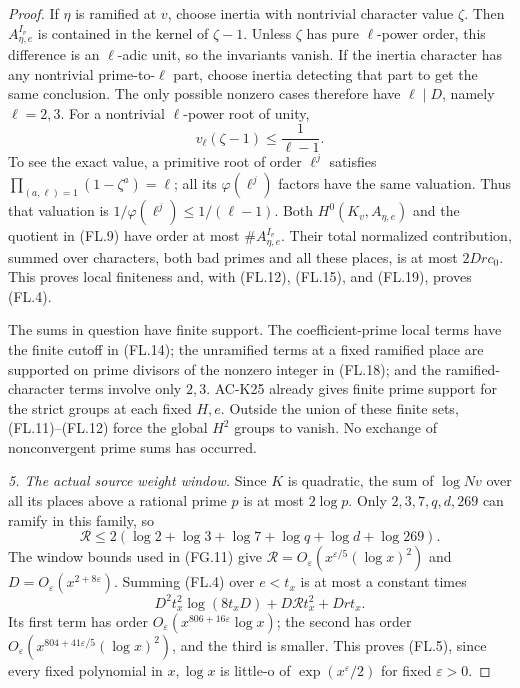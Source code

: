 \begin{proof}
If \(\eta\) is ramified at \(v\), choose inertia with
nontrivial character value \(\zeta\).
Then \(A_{\eta,e}^{I_v}\) is contained in the kernel
of \(\zeta-1\).
Unless \(\zeta\) has pure \(\ell\)-power order, this
difference is an \(\ell\)-adic unit, so the invariants
vanish.  If the inertia character has any nontrivial
prime-to-\(\ell\) part, choose inertia detecting that part
to get the same conclusion.
The only possible nonzero cases therefore have
\(\ell\mid D\), namely \(\ell=2,3\).
For a nontrivial \(\ell\)-power root of unity,
\[
                 v_\ell(\zeta-1)\leq\frac1{\ell-1}.
 \tag{FL.20}
\]
To see the exact value, a primitive root of order
\(\ell^j\) satisfies
\(\prod_{(a,\ell)=1}(1-\zeta^a)=\ell\);
all its \(\varphi(\ell^j)\) factors have the same
valuation.  Thus that valuation is
\(1/\varphi(\ell^j)\leq1/(\ell-1)\).
Both \(H^0(K_v,A_{\eta,e})\) and the quotient in
(FL.9) have order at most \(\#A_{\eta,e}^{I_v}\).
Their total normalized contribution, summed over
characters, both bad primes and all these places, is
at most \(2Dr c_0\).
This proves local finiteness and, with
(FL.12), (FL.15), and (FL.19), proves (FL.4).

The sums in question have finite support.
The coefficient-prime local terms have the finite
cutoff in (FL.14); the unramified terms at a fixed
ramified place are supported on prime divisors of the
nonzero integer in (FL.18); and the ramified-character
terms involve only \(2,3\).
AC-K25 already gives finite prime support for the
strict groups at each fixed \(H,e\).
Outside the union of these finite sets, (FL.11)--(FL.12)
force the global \(H^2\) groups to vanish.
No exchange of nonconvergent prime sums has occurred.

\emph{5. The actual source weight window.}
Since \(K\) is quadratic, the sum of \(\log Nv\)
over all its places above a rational prime \(p\) is
at most \(2\log p\).
Only \(2,3,7,q,d,269\) can ramify in this family, so
\[
 \mathcal R\leq
 2(\log2+\log3+\log7+\log q+\log d+\log269).
 \tag{FL.21}
\]
The window bounds used in (FG.11) give
\(\mathcal R=O_\varepsilon(x^{\varepsilon/5}(\log x)^2)\)
and \(D=O_\varepsilon(x^{2+8\varepsilon})\).
Summing (FL.4) over \(e<t_x\) is at most a constant times
\[
 D^2t_x^2\log(8t_xD)+D\mathcal R t_x^2+Drt_x.
 \tag{FL.22}
\]
Its first term has order
\(O_\varepsilon(x^{806+16\varepsilon}\log x)\);
the second has order
\(O_\varepsilon(x^{804+41\varepsilon/5}(\log x)^2)\),
and the third is smaller.
This proves (FL.5), since every fixed polynomial in
\(x,\log x\) is little-o of \(\exp(x^\varepsilon/2)\)
for fixed \(\varepsilon>0\).
\end{proof}

